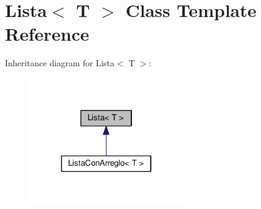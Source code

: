 \hypertarget{class_lista}{}\section{Lista$<$ T $>$ Class Template Reference}
\label{class_lista}


Inheritance diagram for Lista$<$ T $>$\+:
\nopagebreak
\begin{figure}[H]
\begin{center}
\leavevmode
\includegraphics[width=190pt]{class_lista__inherit__graph}
\end{center}
\end{figure}
